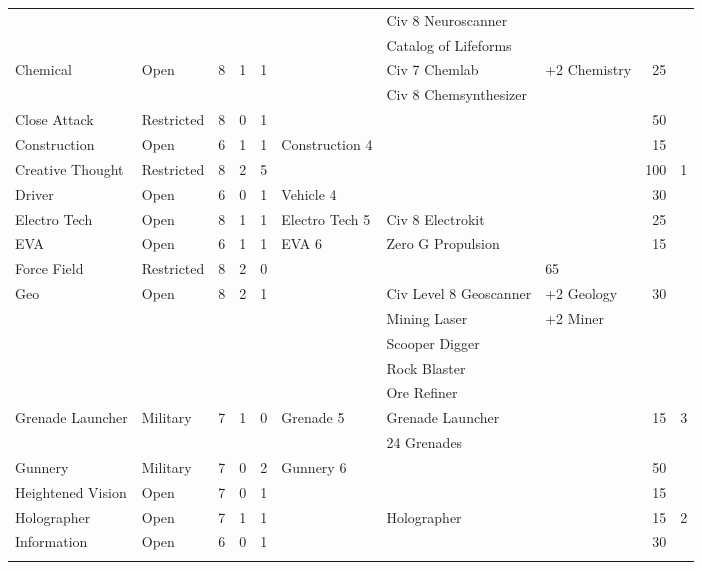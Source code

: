 \begin{table}[htbp]
{\begin{minipage}{\textwidth}
\begin{small}
\begin{tabular}{llccclllrc}
          &            &   &   &   & & Civ 8 Neuroscanner\\
          &            &   &   &   & & Catalog of Lifeforms\\
          \rowcolor{grey}
          Chemical & Open       & 8 & 1 & 1 & & Civ 7 Chemlab & +2
          Chemistry & 25 &\\
          \rowcolor{grey}
          &            &   &   &   & & Civ 8 Chemsynthesizer & & &\\
          Close Attack & Restricted & 8&0&1& & & & 50\\
          \rowcolor{grey}
          Construction & Open   & 6 & 1 & 1 & Construction 4 & & & 15 &\\
          Creative Thought & Restricted & 8&2&5 & & & & 100 & 1\\
          \rowcolor{grey}
          Driver   & Open       & 6 & 0 & 1 & Vehicle 4 & & & 30 &\\
          Electro Tech & Open   & 8 & 1 & 1 & Electro Tech 5 & Civ 8
          Electrokit & & 25\\
          \rowcolor{grey}
          EVA & Open & 6 & 1 & 1 & EVA 6 & Zero G Propulsion & & 15 &\\
          Force Field & Restricted & 8 & 2 & 0 & &  & 65\\
          \rowcolor{grey}
          Geo & Open & 8 & 2 & 1 & & Civ Level 8 Geoscanner & +2 Geology &
          30 &\\
          \rowcolor{grey}
          & & & & & & Mining Laser & +2 Miner & &\\
          \rowcolor{grey}
          &&&&&&Scooper Digger&&&\\
          \rowcolor{grey}
          &&&&&&Rock Blaster&&&\\
          \rowcolor{grey}
          &&&&&&Ore Refiner&&&\\
          Grenade Launcher & Military & 7 & 1 & 0 & Grenade 5 & Grenade
          Launcher & & 15 & 3\\
          &&&&&&24 Grenades\\
          \rowcolor{grey}
          Gunnery & Military & 7 & 0 & 2 & Gunnery 6 & & & 50 &\\
          Heightened Vision & Open & 7 & 0 & 1 & &&&15\\
          \rowcolor{grey}
          Holographer & Open & 7 & 1 & 1 & &Holographer & & 15 & 2\\
          Information & Open & 6 & 0 & 1 & &&&30\\
          \rowcolor{grey}

\end{tabular}
\end{small}
\end{minipage}}
\end{table}
